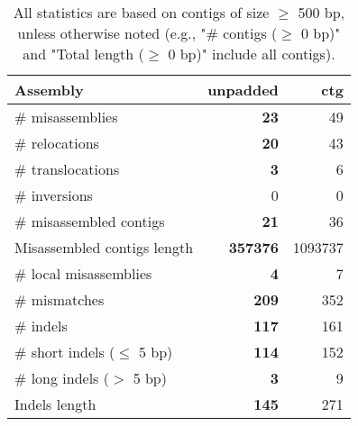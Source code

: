 \documentclass[12pt,a4paper]{article}
\begin{document}
\begin{table}[ht]
\begin{center}
\caption{All statistics are based on contigs of size $\geq$ 500 bp, unless otherwise noted (e.g., "\# contigs ($\geq$ 0 bp)" and "Total length ($\geq$ 0 bp)" include all contigs).}
\begin{tabular}{|l*{2}{|r}|}
\hline
Assembly & unpadded & ctg \\ \hline
\# misassemblies & {\bf 23} & 49 \\ \hline
\hspace{5mm}\# relocations & {\bf 20} & 43 \\ \hline
\hspace{5mm}\# translocations & {\bf 3} & 6 \\ \hline
\hspace{5mm}\# inversions & 0 & 0 \\ \hline
\# misassembled contigs & {\bf 21} & 36 \\ \hline
Misassembled contigs length & {\bf 357376} & 1093737 \\ \hline
\# local misassemblies & {\bf 4} & 7 \\ \hline
\# mismatches & {\bf 209} & 352 \\ \hline
\# indels & {\bf 117} & 161 \\ \hline
\hspace{5mm}\# short indels ($\leq$ 5 bp) & {\bf 114} & 152 \\ \hline
\hspace{5mm}\# long indels ($>$ 5 bp) & {\bf 3} & 9 \\ \hline
Indels length & {\bf 145} & 271 \\ \hline
\end{tabular}
\end{center}
\end{table}
\end{document}

